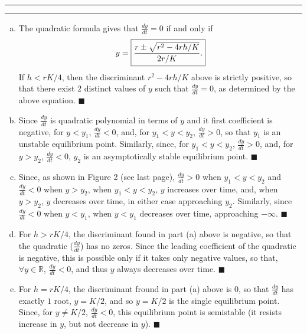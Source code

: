 \documentclass[11pt]{article}
\newcounter{questionCounter}
\newcounter{partCounter}[questionCounter]
\newenvironment{question}[2][\arabic{questionCounter}]{%
    \setcounter{partCounter}{0}%
    \vspace{.25in} \hrule \vspace{0.5em}%
        \noindent{\bf #2}%
    \vspace{0.8em} \hrule \vspace{.10in}%
    \addtocounter{questionCounter}{1}%
}{}
\renewcommand{\qed}{\quad $\blacksquare$}
\begin{document}
\begin{question}{Section 2.5, Problem 21}
\begin{enumerate}[(a)]
\item The quadratic formula gives that $\frac{dy}{dt} = 0$ if and only if
\[y = \mbox{\fbox{$\displaystyle \frac{r \pm \sqrt{r^2 - 4rh/K}}{2r/K}$.}}\]
If $h < rK/4$, then the discriminant $r^2 - 4rh/K$ above is strictly positive,
so that there exist $2$ distinct values of $y$ such that $\frac{dy}{dt} = 0$,
as determined by the above equation. \qed

\item Since $\frac{dy}{dt}$ is quadratic polynomial in terms of $y$ and it
first coefficient is negative, for $y < y_1$, $\frac{dy}{dt} < 0$, and, for
$y_1 < y < y_2$, $\frac{dy}{dt} > 0$, so that $y_1$ is an unstable equilibrium
point. Similarly, since, for $y_1 < y < y_2$, $\frac{dy}{dt} > 0$, and, for
$y > y_2$, $\frac{dy}{dt} < 0$, $y_2$ is an asymptotically stable equilibrium
point. \qed

\item Since, as shown in Figure 2 (see last page), $\frac{dy}{dt} > 0$ when
$y_1 < y < y_2$ and $\frac{dy}{dt} < 0$ when $y > y_2$, when $y_1 < y < y_2$,
$y$ increases over time, and, when $y > y_2$, $y$ decreases over time, in
either case approaching $y_2$. Similarly, since $\frac{dy}{dt} < 0$ when
$y < y_1$, when $y < y_1$ decreases over time, approaching $-\infty$. \qed

\item For $h > rK/4$, the discriminant found in part (a) above is negative, so
that the quadratic ($\frac{dy}{dt}$) has no zeros. Since the leading
coefficient of the quadratic is negative, this is possible only if it takes
only negative values, so that, $\forall y \in \mathbb{R}$,
$\frac{dy}{dt} < 0$, and thus $y$ always decreases over time. \qed

\item For $h = rK/4$, the discriminant fround in part (a) above is $0$, so
that $\frac{dy}{dt}$ has exactly $1$ root, $y = K/2$, and so $y = K/2$ is the
single equilibrium point. Since, for $y \neq K/2$, $\frac{dy}{dt} < 0$, this
equilibrium point is semistable (it resists increase in $y$, but not decrease
in $y$). \qed
\end{enumerate}
\end{question}
\end{document}
